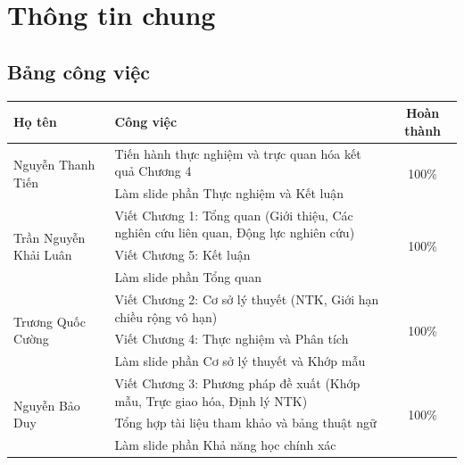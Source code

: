 \chapter*{Thông tin chung}
\section*{Bảng công việc}
\begin{table}[H]
\centering
\small
\renewcommand{\arraystretch}{1.4}
\setlength{\tabcolsep}{6pt}
\begin{tabular}{|p{3.5cm}|p{9cm}|c|}
\hline      
\textbf{Họ tên} & \textbf{Công việc} & \textbf{Hoàn thành} \\ \hline
\multirow{2}{3.5cm}{Nguyễn Thanh Tiến} 
    & Tiến hành thực nghiệm và trực quan hóa kết quả Chương 4 & \multirow{2}{*}{100\%} \\ \cline{2-2} 
    & Làm slide phần Thực nghiệm và Kết luận & \\ \hline
\multirow{3}{3.5cm}{Trần Nguyễn Khải Luân}       
    & Viết Chương 1: Tổng quan (Giới thiệu, Các nghiên cứu liên quan, Động lực nghiên cứu) & \multirow{3}{*}{100\%} \\ \cline{2-2} 
    & Viết Chương 5: Kết luận & \\ \cline{2-2} 
    & Làm slide phần Tổng quan & \\ \hline
\multirow{3}{3.5cm}{Trương Quốc Cường}  
    & Viết Chương 2: Cơ sở lý thuyết (NTK, Giới hạn chiều rộng vô hạn) & \multirow{3}{*}{100\%} \\ \cline{2-2} 
    & Viết Chương 4: Thực nghiệm và Phân tích & \\ \cline{2-2} 
    & Làm slide phần Cơ sở lý thuyết và Khớp mẫu & \\ \hline
\multirow{3}{3.5cm}{Nguyễn Bảo Duy}    
    & Viết Chương 3: Phương pháp đề xuất (Khớp mẫu, Trực giao hóa, Định lý NTK) & \multirow{3}{*}{100\%} \\ \cline{2-2} 
    & Tổng hợp tài liệu tham khảo và bảng thuật ngữ & \\ \cline{2-2} 
    & Làm slide phần Khả năng học chính xác & \\ \hline
\end{tabular}
\end{table}

\pagebreak
